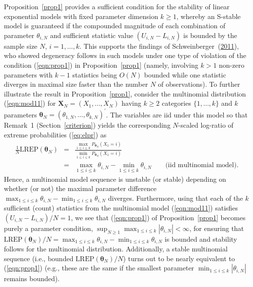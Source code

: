 \documentclass[12pt]{article}
\theoremstyle{definition}
\newcommand{\REP}{\mathrm{LREP}}
\begin{document}
Proposition~\ref{prop1} provides a sufficient condition for the stability of linear exponential models with fixed parameter dimension $k\geq 1$,
whereby an S-stable model is guaranteed if the compounded magnitude of each combination of parameter $\theta_{i,N}$ and sufficient statistic value $(U_{i,N}-L_{i,N})$  is bounded by the sample size $N$, $i=1,\ldots,k$.
This  supports the findings of
Schweinberger~(\protect\hyperlink{ref-schweinberger2011instability}{2011}), who showed degeneracy follows in such models under one type of violation of the condition   (\ref{eqn:prop1}) in Proposition~\ref{prop1} (namely, involving $k>1$ non-zero parameters  with $k-1$ statistics being $O(N)$ bounded  while one statistic  diverges in maximal size faster than the number  $N$ of observations).
To further illustrate the result in Proposition~\ref{prop1}, consider  the multinomial distribution (\ref{eqn:mod11}) for $\boldsymbol X_N=(X_1,\ldots,X_N)$ having $k\geq 2$ categories $\{1,\ldots,k\}$ and $k$ parameters $\boldsymbol \theta_N = (\theta_{1,N},\ldots,\theta_{k,N})^\prime$.  The variables are iid under this model so that Remark~1 (Section~\ref{criterion}) yields the corresponding $N$-scaled  log-ratio of extreme probabilities (\ref{eq:elpr}) as
\begin{eqnarray*}
  \frac{1}{N}\REP(\boldsymbol \theta_N) &=& \frac{\max_{1 \leq i \leq k} P_{\boldsymbol \theta_N}(X_1=i)}{\min_{1 \leq i \leq k} P_{\boldsymbol \theta_N}(X_1=i)}\\& =& \max_{1 \leq i \leq k} \theta_{i,N} - \min_{1 \leq i \leq k} \theta_{i,N} \qquad \mbox{(iid multinomial model)}.
\end{eqnarray*}
Hence, a multinomial model sequence is unstable (or stable) depending on whether (or not) the maximal parameter difference  $\max_{1 \leq i \leq k} \theta_{i,N} - \min_{1 \leq i \leq k} \theta_{i,N}$ diverges.  Furthermore, using that each of the $k$ sufficient (count) statistics from the multinomial model  (\ref{eqn:mod11}) satisfies $(U_{i,N}-L_{i,N})/N=1$,  we  see that  (\ref{eqn:prop1}) of Proposition~\ref{prop1}  becomes purely a parameter condition,
$\sup_{N \geq 1}\max_{1 \leq i \leq k } |\theta_{i,N}| <\infty$, for
  ensuring that
$\REP(\boldsymbol \theta_N)/N =\max_{1 \leq i \leq k} \theta_{i,N} - \min_{1 \leq i \leq k} \theta_{i,N}$ is bounded
and  stability follows
for the multinomial distribution. Additionally, a stable multinomial sequence (i.e., bounded $\REP(\boldsymbol \theta_N)/N$) turns out to be nearly equivalent to (\ref{eqn:prop1})  (e.g., these are the same if the smallest  parameter   $\min_{1 \leq i \leq k } |\theta_{i,N}| $ remains bounded).
\end{document}
